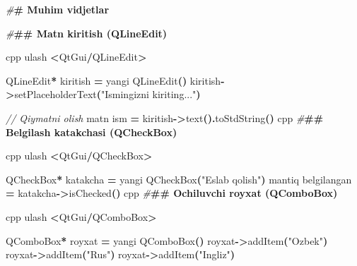 \documentclass[a4paper,11pt,twoside,openright]{book}
\newenvironment{Shaded}{\begin{snugshade}}{\end{snugshade}}
\newcommand{\CommentTok}[1]{\textcolor[rgb]{0.56,0.35,0.01}{\textit{#1}}}
\newcommand{\ErrorTok}[1]{\textcolor[rgb]{0.64,0.00,0.00}{\textbf{#1}}}
\newcommand{\ExtensionTok}[1]{#1}
\newcommand{\NormalTok}[1]{#1}
\newcommand{\OperatorTok}[1]{\textcolor[rgb]{0.81,0.36,0.00}{\textbf{#1}}}
\newcommand{\PreprocessorTok}[1]{\textcolor[rgb]{0.56,0.35,0.01}{\textit{#1}}}
\newcommand{\StringTok}[1]{\textcolor[rgb]{0.31,0.60,0.02}{#1}}
\begin{document}
\begin{Shaded}
\begin{Highlighting}[]
\PreprocessorTok{\#}\ErrorTok{\# Muhim vidjetlar}

\PreprocessorTok{\#}\ErrorTok{\#\# Matn kiritish (\textasciigrave{}QLineEdit\textasciigrave{})}

\ErrorTok{\textasciigrave{}\textasciigrave{}\textasciigrave{}}\NormalTok{cpp}
\NormalTok{ulash }\OperatorTok{\textless{}}\NormalTok{QtGui}\OperatorTok{/}\ExtensionTok{QLineEdit}\OperatorTok{\textgreater{}}

\ExtensionTok{QLineEdit}\OperatorTok{*}\NormalTok{ kiritish }\OperatorTok{=}\NormalTok{ yangi }\ExtensionTok{QLineEdit}\OperatorTok{()}
\NormalTok{kiritish}\OperatorTok{{-}\textgreater{}}\NormalTok{setPlaceholderText}\OperatorTok{(}\StringTok{"Ismingizni kiriting..."}\OperatorTok{)}

\CommentTok{// Qiymatni olish}
\NormalTok{matn ism }\OperatorTok{=}\NormalTok{ kiritish}\OperatorTok{{-}\textgreater{}}\NormalTok{text}\OperatorTok{().}\NormalTok{toStdString}\OperatorTok{()}
\ErrorTok{\textasciigrave{}\textasciigrave{}\textasciigrave{}}\NormalTok{cpp}
\PreprocessorTok{\#}\ErrorTok{\#\# Belgilash katakchasi (\textasciigrave{}QCheckBox\textasciigrave{})}

\ErrorTok{\textasciigrave{}\textasciigrave{}\textasciigrave{}}\NormalTok{cpp}
\NormalTok{ulash }\OperatorTok{\textless{}}\NormalTok{QtGui}\OperatorTok{/}\ExtensionTok{QCheckBox}\OperatorTok{\textgreater{}}

\ExtensionTok{QCheckBox}\OperatorTok{*}\NormalTok{ katakcha }\OperatorTok{=}\NormalTok{ yangi }\ExtensionTok{QCheckBox}\OperatorTok{(}\StringTok{"Eslab qolish"}\OperatorTok{)}
\NormalTok{mantiq belgilangan }\OperatorTok{=}\NormalTok{ katakcha}\OperatorTok{{-}\textgreater{}}\NormalTok{isChecked}\OperatorTok{()}
\ErrorTok{\textasciigrave{}\textasciigrave{}\textasciigrave{}}\NormalTok{cpp}
\PreprocessorTok{\#}\ErrorTok{\#\# Ochiluvchi ro\textquotesingle{}yxat (\textasciigrave{}QComboBox\textasciigrave{})}

\ErrorTok{\textasciigrave{}\textasciigrave{}\textasciigrave{}}\NormalTok{cpp}
\NormalTok{ulash }\OperatorTok{\textless{}}\NormalTok{QtGui}\OperatorTok{/}\ExtensionTok{QComboBox}\OperatorTok{\textgreater{}}

\ExtensionTok{QComboBox}\OperatorTok{*}\NormalTok{ royxat }\OperatorTok{=}\NormalTok{ yangi }\ExtensionTok{QComboBox}\OperatorTok{()}
\NormalTok{royxat}\OperatorTok{{-}\textgreater{}}\NormalTok{addItem}\OperatorTok{(}\StringTok{"O\textquotesingle{}zbek"}\OperatorTok{)}
\NormalTok{royxat}\OperatorTok{{-}\textgreater{}}\NormalTok{addItem}\OperatorTok{(}\StringTok{"Rus"}\OperatorTok{)}
\NormalTok{royxat}\OperatorTok{{-}\textgreater{}}\NormalTok{addItem}\OperatorTok{(}\StringTok{"Ingliz"}\OperatorTok{)}


\end{Highlighting}
\end{Shaded}
\end{document}
